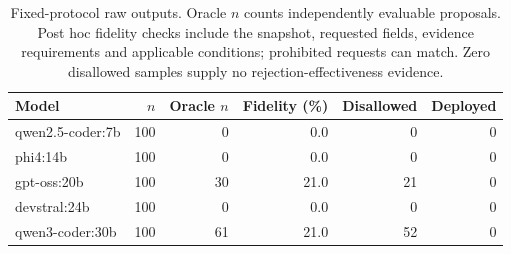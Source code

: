 \begin{table}
\centering\small
\begin{tabular}{lrrrrr}
Model & $n$ & Oracle $n$ & Fidelity (\%) & Disallowed & Deployed \\
\hline
qwen2.5-coder:7b & 100 & 0 & 0.0 & 0 & 0 \\
phi4:14b & 100 & 0 & 0.0 & 0 & 0 \\
gpt-oss:20b & 100 & 30 & 21.0 & 21 & 0 \\
devstral:24b & 100 & 0 & 0.0 & 0 & 0 \\
qwen3-coder:30b & 100 & 61 & 21.0 & 52 & 0 \\
\end{tabular}
\caption{Fixed-protocol raw outputs. Oracle $n$ counts independently evaluable proposals. Post hoc fidelity checks include the snapshot, requested fields, evidence requirements and applicable conditions; prohibited requests can match. Zero disallowed samples supply no rejection-effectiveness evidence.}
\end{table}
